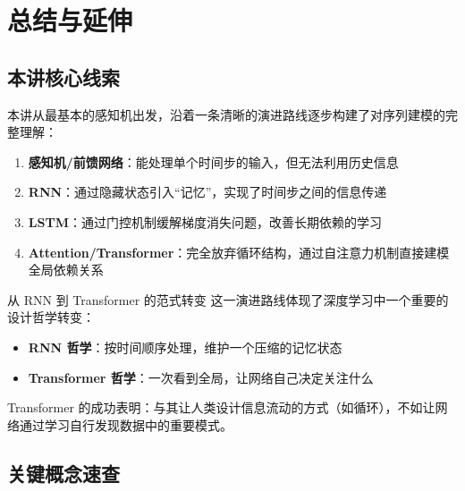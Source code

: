\section{总结与延伸}

\subsection{本讲核心线索}

本讲从最基本的感知机出发，沿着一条清晰的演进路线逐步构建了对序列建模的完整理解：

\begin{enumerate}
    \item \textbf{感知机/前馈网络}：能处理单个时间步的输入，但无法利用历史信息
    \item \textbf{RNN}：通过隐藏状态引入``记忆''，实现了时间步之间的信息传递
    \item \textbf{LSTM}：通过门控机制缓解梯度消失问题，改善长期依赖的学习
    \item \textbf{Attention/Transformer}：完全放弃循环结构，通过自注意力机制直接建模全局依赖关系
\end{enumerate}

\begin{importantbox}{从 RNN 到 Transformer 的范式转变}
这一演进路线体现了深度学习中一个重要的设计哲学转变：
\begin{itemize}
    \item \textbf{RNN 哲学}：按时间顺序处理，维护一个压缩的记忆状态
    \item \textbf{Transformer 哲学}：一次看到全局，让网络自己决定关注什么
\end{itemize}
Transformer 的成功表明：与其让人类设计信息流动的方式（如循环），不如让网络通过学习自行发现数据中的重要模式。
\end{importantbox}

\subsection{关键概念速查}

